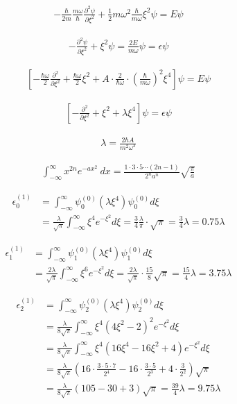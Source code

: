 \documentclass[11pt,pra,aps]{revtex4}
\begin{document}
\begin{align}
  -\frac{\hbar}{2m}\frac{m\omega}{\hbar}\frac{\partial^2\psi}{\partial \xi^2}+\frac{1}{2}m\omega^2\frac{\hbar}{m\omega}\xi^2\psi=E\psi
\end{align}

\begin{align}
  -\frac{\partial^2\psi}{\partial \xi^2}+\xi^2\psi=\frac{2E}{m\omega}\psi=\epsilon\psi
\end{align}

\begin{align}
  \left[-\frac{\hbar\omega}{2}\frac{\partial^2}{\partial \xi^2}+\frac{\hbar\omega}{2}\xi^2+A\cdot\frac{2}{\hbar\omega}\cdot\left(\frac{\hbar}{m\omega}\right)^2\xi^4\right]\psi=E\psi
\end{align}

\begin{align}
  \left[-\frac{\partial^2}{\partial \xi^2}+\xi^2+\lambda\xi^4\right]\psi=\epsilon\psi
\end{align}

\begin{align}
\lambda=\frac{2\hbar A}{m^2\omega^3}
\end{align}

\begin{align}
  \int^{\infty}_{-\infty}x^{2n}e^{-ax^2}\ dx = \frac{1\cdot3\cdot5\cdots(2n-1)}{2^n a^n}\sqrt{\frac{\pi}{a}}
\end{align}

\begin{align}
  \epsilon^{(1)}_0&=\int^{\infty}_{-\infty} \psi^{(0)}_0\left(\lambda \xi^4\right) \psi^{(0)}_0 d\xi \\
  &=\frac{\lambda}{\sqrt{\pi}} \int^{\infty}_{-\infty} \xi^4 e^{-\xi^2} d\xi=\frac{3}{4}\frac{\lambda}{\pi}\cdot\sqrt{\pi}=\frac{3}{4}\lambda=0.75\lambda
\end{align}

\begin{align}
  \epsilon^{(1)}_1&=\int^{\infty}_{-\infty} \psi^{(0)}_1\left(\lambda \xi^4\right) \psi^{(0)}_1 d\xi \\
  &= \frac{2\lambda}{\sqrt{\pi}} \int^{\infty}_{-\infty} \xi^6 e^{-\xi^2} d\xi = \frac{2\lambda}{\sqrt{\pi}}\cdot\frac{15}{8}\sqrt{\pi} = \frac{15}{4}\lambda=3.75\lambda
\end{align}

\begin{align}
  \epsilon^{(1)}_2&=\int^{\infty}_{-\infty} \psi^{(0)}_2\left(\lambda \xi^4\right) \psi^{(0)}_2 d\xi \\
  &= \frac{\lambda}{8\sqrt{\pi}} \int^{\infty}_{-\infty} \xi^4 (4\xi^2-2)^2 e^{-\xi^2} d\xi \\
  &= \frac{\lambda}{8\sqrt{\pi}} \int^{\infty}_{-\infty} \xi^4 (16\xi^4-16\xi^2+4) e^{-\xi^2} d\xi \\
  &= \frac{\lambda}{8\sqrt{\pi}} \left(16\cdot\frac{3\cdot5\cdot7}{2^4}-16\cdot\frac{3\cdot5}{2^3}+4\cdot\frac{3}{2^2}\right) \sqrt{\pi}\\
  &= \frac{\lambda}{8\sqrt{\pi}} \left(105-30+3\right) \sqrt{\pi}=\frac{39}{4}\lambda=9.75\lambda\\
\end{align}
\end{document}
